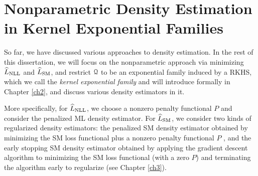 
\section{Nonparametric Density Estimation in Kernel Exponential Families}\label{section-our-focus}

So far, we have discussed various approaches to density estimation. In the rest of this dissertation, we will focus on the nonparametric approach via minimizing $\widehat{L}_{\mathrm{NLL}}$ and $\widehat{L}_{\mathrm{SM}}$, and restrict $\mathcal{Q}$ to be an exponential family induced by a RKHS, which we call the \textit{kernel exponential family} and will introduce formally in Chapter \ref{ch2}, and discuss various density estimators in it. 

More specifically, for $\widehat{L}_{\mathrm{NLL}}$, we choose a nonzero penalty functional $P$ and consider the penalized ML density estimator. For $\widehat{L}_{\mathrm{SM}}$, we consider two kinds of regularized density estimators: the penalized SM density estimator obtained by minimizing the SM loss functional plus a nonzero penalty functional $P$ \parencite{Sriperumbudur-density-estimation-inf-exp-family}, and the early stopping SM density estimator obtained by applying the gradient descent algorithm to minimizing the SM loss functional (with a zero $P$) and terminating the algorithm early to regularize (see Chapter \ref{ch3}). 

